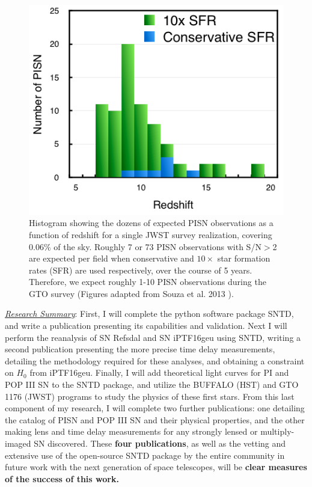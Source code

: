 \begin{figure}
\centering
\includegraphics[height=.4\textwidth]{FIG/high_low_rates2}
\caption{
\noindent\fontsize{10}{14}\selectfont
Histogram showing the dozens of expected PISN observations as a
function of redshift for a single JWST survey realization, covering
0.06$\%$ of the sky. Roughly 7 or 73 PISN observations with S/N$>$2
are expected per field when conservative and $10\times$ star formation
rates (SFR) are used respectively, over the course of 5
years. Therefore, we expect roughly 1-10 PISN observations during the
GTO survey (Figures adapted from Souza et
al. 2013 \cite{Souza:2013}).}
\end{figure}

\noindent\underline{\textit{Research Summary}}:
First, I will complete the python software package SNTD, and write a
publication presenting its capabilities and validation. Next I will
perform the reanalysis of SN Refsdal and SN iPTF16geu using SNTD,
writing a second publication presenting the more precise time delay
measurements, detailing the methodology required for these analyses,
and obtaining a constraint on $H_0$ from iPTF16geu. Finally, I will
add theoretical light curves for PI and POP III SN to the SNTD
package, and utilize the BUFFALO (HST) and GTO 1176 (JWST) programs to
study the physics of these first stars. From this last component of my
research, I will complete two further publications: one detailing the
catalog of PISN and POP III SN and their physical properties, and the
other making lens and time delay measurements for any strongly lensed
or multiply-imaged SN discovered. These \textbf{four publications}, as
well as the vetting and extensive use of the open-source SNTD package by the
entire community in future work with the next generation of space
telescopes, will be \textbf{clear measures of the success of this
work.}

